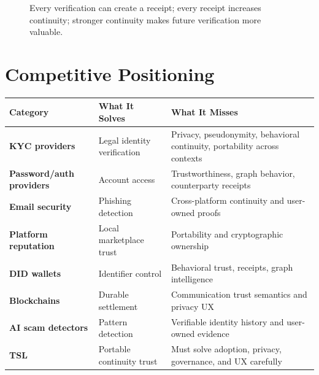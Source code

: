 \documentclass[11pt]{article}
\newcommand{\TSL}{\textsc{TSL}}
\begin{document}
\begin{figure}[H]
\centering
{}
\caption{Every verification can create a receipt; every receipt increases continuity; stronger continuity makes future verification more valuable.}
\end{figure}

\section{Competitive Positioning}

\begin{center}
\begin{tabularx}{\textwidth}{>{\bfseries}p{} X X}
\toprule
Category & What It Solves & What It Misses \\
\midrule
KYC providers & Legal identity verification & Privacy, pseudonymity, behavioral continuity, portability across contexts \\
Password/auth providers & Account access & Trustworthiness, graph behavior, counterparty receipts \\
Email security & Phishing detection & Cross-platform continuity and user-owned proofs \\
Platform reputation & Local marketplace trust & Portability and cryptographic ownership \\
DID wallets & Identifier control & Behavioral trust, receipts, graph intelligence \\
Blockchains & Durable settlement & Communication trust semantics and privacy UX \\
AI scam detectors & Pattern detection & Verifiable identity history and user-owned evidence \\
\TSL{} & Portable continuity trust & Must solve adoption, privacy, governance, and UX carefully \\
\bottomrule
\end{tabularx}
\end{center}
\end{document}
